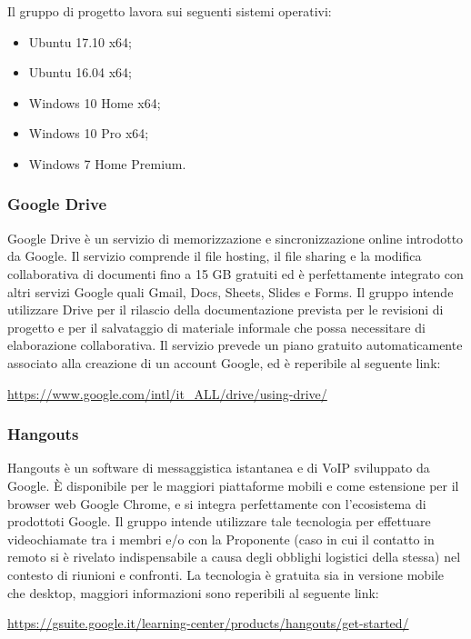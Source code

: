 \documentclass[../NormediProgetto.tex]{subfiles}
\begin{document}
	Il gruppo di progetto lavora sui seguenti sistemi operativi:
	\begin{itemize}
		\item Ubuntu 17.10 x64;
		\item Ubuntu 16.04  x64;
		\item Windows 10 Home x64;
		\item Windows 10 Pro x64;
		\item Windows 7 Home Premium.
	\end{itemize}

	\subsubsection{Google Drive}
	Google Drive è un servizio di memorizzazione e sincronizzazione online introdotto da Google. Il servizio comprende il file hosting, il file sharing e la modifica collaborativa di documenti fino a 15 GB gratuiti ed è perfettamente integrato con altri servizi Google quali Gmail, Docs, Sheets, Slides e Forms. Il gruppo intende utilizzare Drive per il rilascio della documentazione prevista per le revisioni di progetto e per il salvataggio di materiale informale che possa necessitare di elaborazione collaborativa. Il servizio prevede un piano gratuito automaticamente associato alla creazione di un account Google, ed è reperibile al seguente link:
	\begin{center}
		\url{https://www.google.com/intl/it_ALL/drive/using-drive/}
	\end{center}
	
	\subsubsection{Hangouts}
	Hangouts è un software di messaggistica istantanea e di VoIP sviluppato da Google. È disponibile per le maggiori piattaforme mobili e come estensione per il browser web Google Chrome, e si integra perfettamente con l'ecosistema di prodottoti Google. Il gruppo intende utilizzare tale tecnologia per effettuare videochiamate tra i membri e/o con la Proponente (caso in cui il contatto in remoto si è rivelato indispensabile a causa degli obblighi logistici della stessa) nel contesto di riunioni e confronti. La tecnologia è gratuita sia in versione mobile che desktop, maggiori informazioni sono reperibili al seguente link:
	\begin{center}
		\url{https://gsuite.google.it/learning-center/products/hangouts/get-started/}
	\end{center}
	
\end{document}
